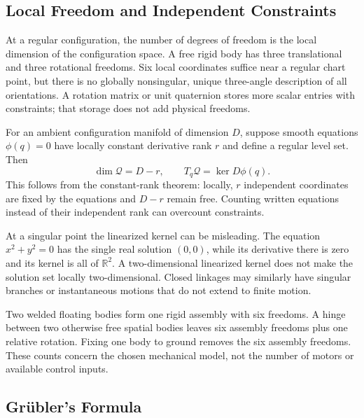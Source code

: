 \subsection{Local Freedom and Independent Constraints}

At a regular configuration, the number of degrees of freedom is the local dimension of the configuration space. A free rigid body has three translational and three rotational freedoms. Six local coordinates suffice near a regular chart point, but there is no globally nonsingular, unique three-angle description of all orientations. A rotation matrix or unit quaternion stores more scalar entries with constraints; that storage does not add physical freedoms.

For an ambient configuration manifold of dimension $D$, suppose smooth equations $\phi(q)=0$ have locally constant derivative rank $r$ and define a regular level set. Then
\begin{equation}
 \dim\mathcal Q=D-r,\qquad T_q\mathcal Q=\ker D\phi(q).
\end{equation}
This follows from the constant-rank theorem: locally, $r$ independent coordinates are fixed by the equations and $D-r$ remain free. Counting written equations instead of their independent rank can overcount constraints.

At a singular point the linearized kernel can be misleading. The equation $x^2+y^2=0$ has the single real solution $(0,0)$, while its derivative there is zero and its kernel is all of $\mathbb R^2$. A two-dimensional linearized kernel does not make the solution set locally two-dimensional. Closed linkages may similarly have singular branches or instantaneous motions that do not extend to finite motion.

Two welded floating bodies form one rigid assembly with six freedoms. A hinge between two otherwise free spatial bodies leaves six assembly freedoms plus one relative rotation. Fixing one body to ground removes the six assembly freedoms. These counts concern the chosen mechanical model, not the number of motors or available control inputs.

\subsection{Grübler's Formula}
\label{subsec:grubler}
\label{thm:grubler_spatial}
\label{thm:grubler_planar}

